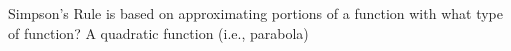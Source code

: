 {Simpson's Rule is based on approximating portions of a function with what type of function?
}
{A quadratic function (i.e., parabola)
}
